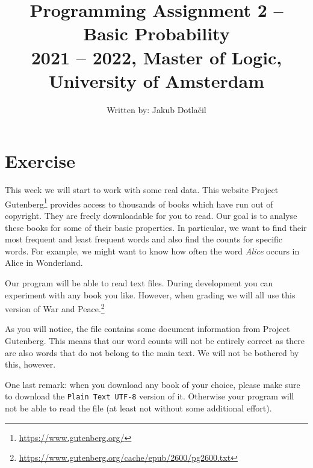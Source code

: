 \documentclass[11pt, a4paper]{article}
\title{Programming Assignment 2 -- Basic Probability \\[2mm]
\large{2021 -- 2022, Master of Logic, University of Amsterdam}}
\author{Written by: Jakub Dotla\v{c}il}
\newcommand{\link}[1]{\footnote{\color{blue}\href{#1}{#1}}}
\begin{document}
\date{}\maketitle

\section{Exercise}
This week we will start to work with some real data. This website Project Gutenberg\link{https://www.gutenberg.org/} provides access to thousands of
books which have run out of copyright. They are freely downloadable for you to read. Our goal is to analyse these books for some of their basic 
properties. In particular, we want to find their most frequent and least frequent words and also find the counts for specific words. For example,
we might want to know how often the word \textit{Alice} occurs in Alice in Wonderland.

Our program will be able to read text files. During development you can experiment
with any book you like. However, when grading we will all use this version of War and Peace.\link{https://www.gutenberg.org/cache/epub/2600/pg2600.txt}

As you will notice, the file contains some document information from Project Gutenberg. This means that our word counts will not be entirely correct as
there are also words that do not belong to the main text. We will not be bothered by this, however.

One last remark: when you download any book of your choice, please make sure to download the \texttt{Plain Text UTF-8} version of it. Otherwise your
program will not be able to read the file (at least not without some additional effort).
\end{document}
